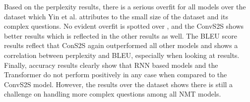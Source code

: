 Based on the perplexity results, there is a serious overfit for all models over the \LCQuADone{} 
dataset which Yin et al. attributes to the small size of the dataset and its complex questions. 
No evident overfit is spotted over \DBNQA, and the ConvS2S shows better results which is 
reflected in the other results as well. The BLEU score results reflect that ConS2S again 
outperformed all other models and shows a correlation between perplexity and BLEU, especially 
when looking at \DBNQA{} results. Finally, accuracy results clearly show that RNN based models and 
the Transformer do not perform positively in any case when compared to the ConvS2S model. 
However, the results over the \LCQuADone{} dataset shows there is still a challenge on handling more 
complex questions among all NMT models.

